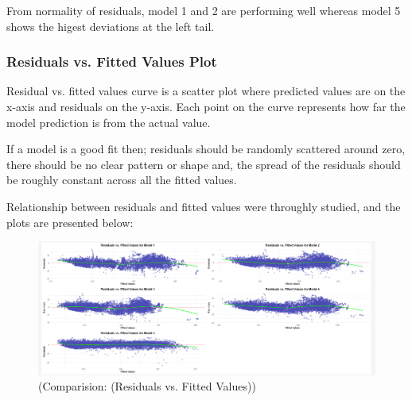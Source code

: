 \documentclass[12pt,a4paper]{article}
\begin{document}
From normality of residuals, model 1 and 2 are performing well whereas model 5 shows the 
higest deviations at the left tail.

\subsubsection*{Residuals vs. Fitted Values Plot}

Residual vs. fitted values curve is a scatter plot 
where predicted values are on the x-axis and 
residuals on the y-axis. Each point on the curve 
represents how far the model prediction is from the actual
value. 


If a model is a good fit then; residuals should be 
randomly scattered around zero, there should be no clear 
pattern or shape and, the spread of the residuals 
should be roughly constant across all the fitted 
values. 


Relationship between residuals and fitted values were throughly studied, 
and the plots are presented below:

\begin{figure}[H]
  \centering
  \includegraphics[width=\textwidth]{y10.png}
  \caption{(Comparision: (Residuals vs. Fitted Values))}
  \label{fig:Residuals vs. Fitted Values}
\end{figure}

\end{document}
